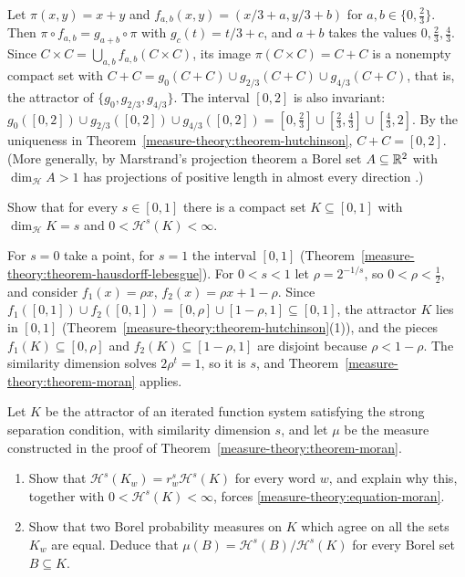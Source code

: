 \begin{solution}
Let $\pi(x, y) = x + y$ and $f_{a, b}(x, y) = (x/3 + a, y/3 + b)$ for $a, b \in \{0, \frac23\}$. Then $\pi \circ f_{a, b} = g_{a + b} \circ \pi$ with $g_c(t) = t/3 + c$, and $a + b$ takes the values
$0, \frac23, \frac43$. Since $C \times C = \bigcup_{a, b}f_{a, b}(C \times C)$, its image $\pi(C \times C) = C + C$ is a nonempty compact set with $C + C = g_0(C + C) \cup g_{2/3}(C + C) \cup g_{4/3}(C + C)$,
that is, the attractor of $\{g_0, g_{2/3}, g_{4/3}\}$. The interval $[0, 2]$ is also invariant: $g_0([0, 2]) \cup g_{2/3}([0, 2]) \cup g_{4/3}([0, 2]) = [0, \frac23] \cup [\frac23, \frac43] \cup [\frac43, 2]$. By
the uniqueness in Theorem~\ref{measure-theory:theorem-hutchinson}, $C + C = [0, 2]$. (More generally, by Marstrand's projection theorem a Borel set $A \subseteq \mathbb{R}^2$ with $\dim_{\mathcal{H}}A > 1$ has
projections of positive length in almost every direction \cite{mattila-1995}.)
\end{solution}

\begin{exercise}\label{measure-theory:exercise-prescribed-dimension}
Show that for every $s \in [0, 1]$ there is a compact set $K \subseteq [0, 1]$ with $\dim_{\mathcal{H}}K = s$ and $0 < \mathcal{H}^s(K) < \infty$.
\end{exercise}

\begin{solution}
For $s = 0$ take a point, for $s = 1$ the interval $[0, 1]$ (Theorem~\ref{measure-theory:theorem-hausdorff-lebesgue}). For $0 < s < 1$ let $\rho = 2^{-1/s}$, so $0 < \rho < \frac12$, and consider
$f_1(x) = \rho x$, $f_2(x) = \rho x + 1 - \rho$. Since $f_1([0, 1]) \cup f_2([0, 1]) = [0, \rho] \cup [1 - \rho, 1] \subseteq [0, 1]$, the attractor $K$ lies in $[0, 1]$
(Theorem~\ref{measure-theory:theorem-hutchinson}(1)), and the pieces $f_1(K) \subseteq [0, \rho]$ and $f_2(K) \subseteq [1 - \rho, 1]$ are disjoint because $\rho < 1 - \rho$. The similarity dimension solves
$2\rho^t = 1$, so it is $s$, and Theorem~\ref{measure-theory:theorem-moran} applies.
\end{solution}

\begin{exercise}\label{measure-theory:exercise-natural-measure}
Let $K$ be the attractor of an iterated function system satisfying the strong separation condition, with similarity dimension $s$, and let $\mu$ be the measure constructed in the proof of
Theorem~\ref{measure-theory:theorem-moran}.
\begin{enumerate}
\item Show that $\mathcal{H}^s(K_w) = r_w^s\mathcal{H}^s(K)$ for every word $w$, and explain why this, together with $0 < \mathcal{H}^s(K) < \infty$, forces \eqref{measure-theory:equation-moran}.
\item Show that two Borel probability measures on $K$ which agree on all the sets $K_w$ are equal. Deduce that $\mu(B) = \mathcal{H}^s(B)/\mathcal{H}^s(K)$ for every Borel set $B \subseteq K$.
\end{enumerate}
\end{exercise}

